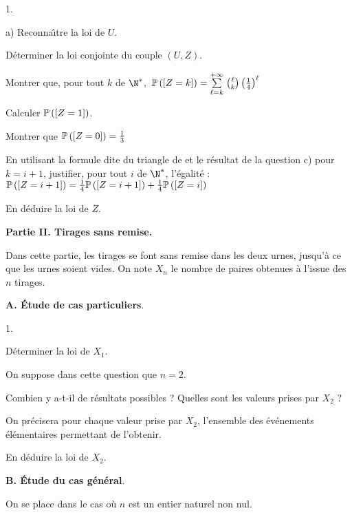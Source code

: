 \documentclass[11pt]{article}%
\begin{document}
\begin{noliste}{1.}
\begin{noliste}{a)}
Reconna\^{\i}tre la loi de $U$.

\item Déterminer la loi conjointe du couple $\left( U,Z\right) $.

\item Montrer que, pour tout $k$ de $\N^{*}$,\ $\mathbb{P}\left(\left[ { Z =
k} \right]\right) = {\textstyle\sum\limits_{\ell = k}^{+ \infty }}\hspace{.1cm}\binom{\ell }{k}\left( 
\frac{1}{4}\right) ^{\ell }$

\item Calculer $\mathbb{P}\left(\left[ { Z = 1} \right]\right) $.

Montrer que $\mathbb{P}\left(\left[ { Z = 0} \right]\right) = \frac{1}{3}$

\item En utilisant la formule dite du triangle de \Scilab{} et le
résultat
de la question c) pour ${k = i + 1}$, justifier, pour tout $i$ de
$\N^{*} $, l'égalité : \\
$\mathbb{P}\left(\left[ { Z = i + 1} \right]\right) = \frac{1}{4}\mathbb{P}\left(\left[ { Z = i +
1} \right]\right) + \frac{1}{4}\mathbb{P}\left(\left[ { Z = i} \right]\right) $

\item En déduire la loi de $Z$.
\end{noliste}
\end{noliste}

\textbf{Partie II. Tirages sans remise.}

Dans cette partie, les tirages se font sans remise dans les deux urnes,
jusqu'à ce que les urnes soient vides. On note $X_{n}$ le nombre de
paires obtenues à l'issue des $n$ tirages.

\textbf{A. Étude de cas particuliers}.

\begin{noliste}{1.}
 \setlength{\itemsep}{4mm}
\item Déterminer la loi de $X_{1}.$

\item On suppose dans cette question que $n = 2$.

Combien y a-t-il de résultats possibles ? Quelles sont les valeurs
prises par $X_{2}$ ?

On précisera pour chaque valeur prise par $X_{2}$, l'ensemble des
événements élémentaires permettant de l'obtenir.

En déduire la loi de $X_{2}$.
\end{noliste}

\textbf{B. Étude du cas général}.

On se place dans le cas où $n$ est un entier naturel non nul.
\end{document}
